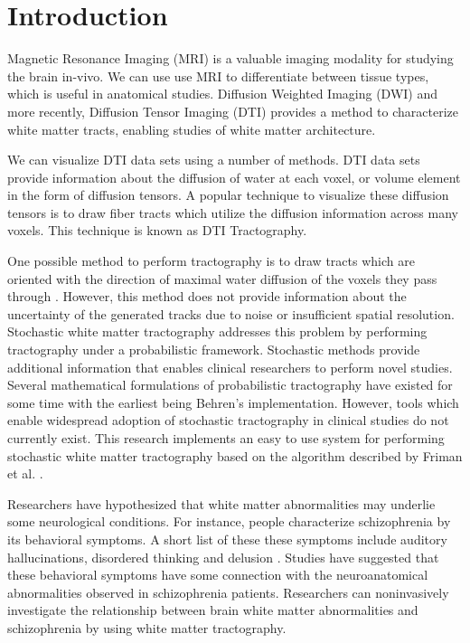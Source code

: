 \chapter{Introduction}

Magnetic Resonance Imaging (MRI) is a valuable imaging modality for studying the brain in-vivo.  We can use use MRI to differentiate between tissue types, which is useful in anatomical studies.  Diffusion Weighted Imaging (DWI) and more recently, Diffusion Tensor Imaging (DTI) provides a method to characterize white matter tracts, enabling studies of white matter architecture.

We can visualize DTI data sets using a number of methods.  DTI data sets provide information about the diffusion of water at each voxel, or volume element in the form of diffusion tensors.  A popular technique to visualize these diffusion tensors is to draw fiber tracts which utilize the diffusion information across many voxels.  This technique is known as DTI Tractography.

One possible method to perform tractography is to draw tracts which are oriented with the direction of maximal water diffusion of the voxels they pass through \cite{frimanTMI06}.  However, this method does not provide information about the uncertainty of the generated tracks due to noise or insufficient spatial resolution.  Stochastic white matter tractography addresses this problem by performing tractography under a probabilistic framework.  Stochastic methods provide additional information that enables clinical researchers to perform novel studies.  Several mathematical formulations of probabilistic tractography have existed for some time with the earliest being Behren's implementation\cite{behrensMRM03}.  However, tools which enable widespread adoption of stochastic tractography in clinical studies do not currently exist.  This research implements an easy to use system for performing stochastic white matter tractography based on the algorithm described by Friman et al. \cite{frimanTMI06}.

Researchers have hypothesized that white matter abnormalities may underlie some neurological conditions.  For instance, people characterize schizophrenia by its behavioral symptoms.  A short list of these these symptoms include auditory hallucinations, disordered thinking and delusion \cite{kubickiNYAS05}.  Studies have suggested that these behavioral symptoms have some connection with the neuroanatomical abnormalities observed in schizophrenia patients\cite{kubickiNYAS05}.  Researchers can noninvasively investigate the relationship between brain white matter abnormalities and schizophrenia by using white matter tractography.


